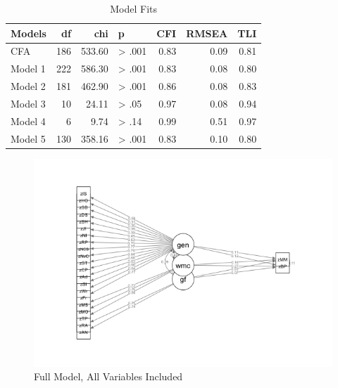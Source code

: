 \documentclass[12pt,]{book}
\begin{document}
\begin{table}[t]

\caption{\label{tab:ModelFits}Model Fits}
\centering
\begin{tabular}{lrrlrrr}
\toprule
Models & df & chi & p & CFI & RMSEA & TLI\\
\midrule
CFA & 186 & 533.60 & > .001 & 0.83 & 0.09 & 0.81\\
Model 1 & 222 & 586.30 & > .001 & 0.83 & 0.08 & 0.80\\
Model 2 & 181 & 462.90 & > .001 & 0.86 & 0.08 & 0.83\\
Model 3 & 10 & 24.11 & > .05 & 0.97 & 0.08 & 0.94\\
Model 4 & 6 & 9.74 & > .14 & 0.99 & 0.51 & 0.97\\
\addlinespace
Model 5 & 130 & 358.16 & > .001 & 0.83 & 0.10 & 0.80\\
\bottomrule
\end{tabular}
\end{table}

\begin{figure}

{\centering \includegraphics[width=1\linewidth]{img/sem1} 

}

\caption{Full Model, All Variables Included}\label{fig:model1}
\end{figure}
\end{document}

